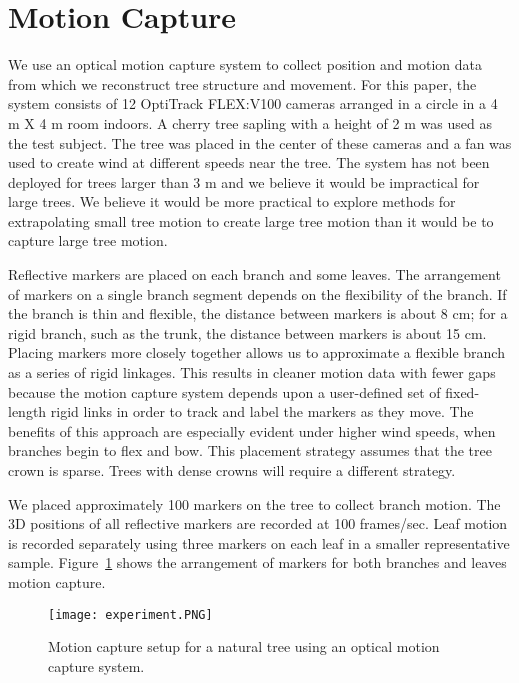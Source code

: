 \section{Motion Capture} 

We use an optical motion capture system to collect position and motion data from which we reconstruct tree structure and movement. For this paper, the system consists of 12 OptiTrack FLEX:V100 cameras arranged in a circle in a 4 m X 4 m room indoors.  A cherry tree sapling with a height of 2 m was used as the test subject.  The tree was placed in the center of these cameras and a fan was used to create wind at different speeds near the tree.  The system has not been deployed for trees larger than 3 m and we believe it would be impractical for large trees.  We believe it would be more practical to explore methods for extrapolating small tree motion to create large tree motion than it would be to capture large tree motion.  

Reflective markers are placed on each branch and some leaves. The arrangement of markers on a single branch segment depends on the flexibility of the branch. If the branch is thin and flexible, the distance between markers is about 8 cm; for a rigid branch, such as the trunk, the distance between markers is about 15 cm. Placing markers more closely together allows us to approximate a flexible branch as a series of rigid linkages.  This results in cleaner motion data with fewer gaps because the motion capture system depends upon a user-defined set of fixed-length rigid links in order to track and label the markers as they move. The benefits of this approach are especially evident under higher wind speeds, when branches begin to flex and bow.  This placement strategy assumes that the tree crown is sparse.  Trees with dense crowns will require a different strategy.

We placed approximately 100 markers on the tree to collect branch motion. The 3D positions of all reflective markers are recorded at 100 frames/sec. Leaf motion is recorded separately using three markers on each leaf in a smaller representative sample. Figure~\ref{fig:Setup} shows the arrangement of markers for both branches and leaves motion capture.

\begin{figure}[tb]
\centering
\texttt{[image: experiment.PNG]}
\caption[Motion capture set up for a natural tree.]{Motion capture setup for a natural tree using an optical motion capture system. }
\label{fig:Setup} 
\end{figure}

